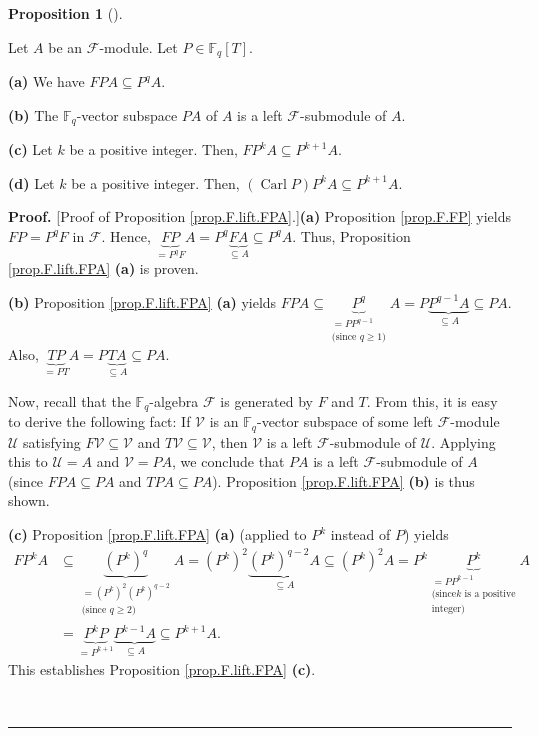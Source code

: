 \documentclass[numbers=enddot,12pt,final,onecolumn,notitlepage]{scrartcl}%
\theoremstyle{definition}
\newtheorem{prop}[theo]{Proposition}
\newenvironment{proposition}[1][]
{\begin{prop}[#1]\begin{leftbar}}
{\end{leftbar}\end{prop}}
\newenvironment{proof}[1][Proof]{\noindent\textbf{#1.} }{\ \rule{0.5em}{0.5em}}
\begin{document}
\begin{proposition}
\label{prop.F.lift.FPA}Let $A$ be an $\mathcal{F}$-module. Let $P\in
\mathbb{F}_{q}\left[  T\right]  $.

\textbf{(a)} We have $FPA\subseteq P^{q}A$.

\textbf{(b)} The $\mathbb{F}_{q}$-vector subspace $PA$ of $A$ is a left
$\mathcal{F}$-submodule of $A$.

\textbf{(c)} Let $k$ be a positive integer. Then, $FP^{k}A\subseteq P^{k+1}A$.

\textbf{(d)} Let $k$ be a positive integer. Then, $\left(
\operatorname*{Carl}P\right)  P^{k}A\subseteq P^{k+1}A$.
\end{proposition}

\begin{proof}
[Proof of Proposition \ref{prop.F.lift.FPA}.]\textbf{(a)} Proposition
\ref{prop.F.FP} yields $FP=P^{q}F$ in $\mathcal{F}$. Hence, $\underbrace{FP}%
_{=P^{q}F}A=P^{q}\underbrace{FA}_{\subseteq A}\subseteq P^{q}A$. Thus,
Proposition \ref{prop.F.lift.FPA} \textbf{(a)} is proven.

\textbf{(b)} Proposition \ref{prop.F.lift.FPA} \textbf{(a)} yields
$FPA\subseteq\underbrace{P^{q}}_{\substack{=PP^{q-1}\\\text{(since }%
q\geq1\text{)}}}A=P\underbrace{P^{q-1}A}_{\subseteq A}\subseteq PA$. Also,
$\underbrace{TP}_{=PT}A=P\underbrace{TA}_{\subseteq A}\subseteq PA$.

Now, recall that the $\mathbb{F}_{q}$-algebra $\mathcal{F}$ is generated by
$F$ and $T$. From this, it is easy to derive the following fact: If
$\mathcal{V}$ is an $\mathbb{F}_{q}$-vector subspace of some left
$\mathcal{F}$-module $\mathcal{U}$ satisfying $F\mathcal{V}\subseteq
\mathcal{V}$ and $T\mathcal{V}\subseteq\mathcal{V}$, then $\mathcal{V}$ is a
left $\mathcal{F}$-submodule of $\mathcal{U}$. Applying this to $\mathcal{U}%
=A$ and $\mathcal{V}=PA$, we conclude that $PA$ is a left $\mathcal{F}%
$-submodule of $A$ (since $FPA\subseteq PA$ and $TPA\subseteq PA$).
Proposition \ref{prop.F.lift.FPA} \textbf{(b)} is thus shown.

\textbf{(c)} Proposition \ref{prop.F.lift.FPA} \textbf{(a)} (applied to
$P^{k}$ instead of $P$) yields%
\begin{align*}
FP^{k}A  &  \subseteq\underbrace{\left(  P^{k}\right)  ^{q}}%
_{\substack{=\left(  P^{k}\right)  ^{2}\left(  P^{k}\right)  ^{q-2}%
\\\text{(since }q\geq2\text{)}}}A=\left(  P^{k}\right)  ^{2}%
\underbrace{\left(  P^{k}\right)  ^{q-2}A}_{\subseteq A}\subseteq\left(
P^{k}\right)  ^{2}A=P^{k}\underbrace{P^{k}}_{\substack{=PP^{k-1}\\\text{(since
}k\text{ is a positive}\\\text{integer)}}}A\\
&  =\underbrace{P^{k}P}_{=P^{k+1}}\underbrace{P^{k-1}A}_{\subseteq A}\subseteq
P^{k+1}A.
\end{align*}
This establishes Proposition \ref{prop.F.lift.FPA} \textbf{(c)}.


\end{proof}
\end{document}
